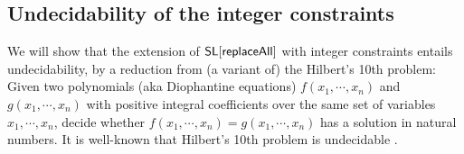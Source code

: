 %	


%	
 


\subsection{Undecidability of the integer constraints}

We will show that the extension of $\mathsf{SL}[\mathsf{replaceAll}]$ with integer constraints entails undecidability, by a reduction from (a variant of) the Hilbert's 10th problem: Given two polynomials (aka Diophantine equations) $f(x_1, \cdots, x_n)$ and $g(x_1,\cdots, x_n)$ with positive integral coefficients over the same set of variables $x_1, \cdots, x_n$, decide whether $f(x_1, \cdots, x_n)=g(x_1, \cdots, x_n)$ has a solution in natural numbers. It is well-known that Hilbert's 10th problem is undecidable \cite{Mat93}.


